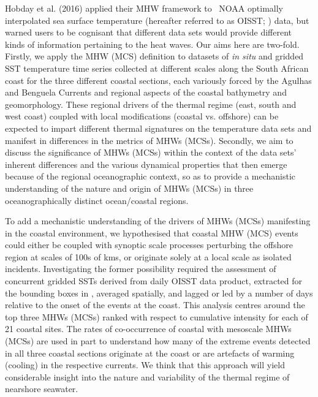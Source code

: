 \documentclass[a4paper,10pt,review]{elsarticle}
\begin{document}
Hobday et al. (2016) \cite{Hobday2016} applied their MHW framework to \degree~NOAA optimally interpolated sea surface temperature (hereafter referred to as OISST; \cite{Reynolds2007}) data, but warned users to be cognisant that different data sets would provide different kinds of information pertaining to the heat waves. Our aims here are two-fold. Firstly, we apply the MHW (MCS) definition to datasets of \emph{in situ} and gridded SST temperature time series collected at different scales along the South African coast for the three different coastal sections, each variously forced by the Agulhas and Benguela Currents and regional aspects of the coastal bathymetry and geomorphology. These regional drivers of the thermal regime (east, south and west coast) coupled with local modifications (coastal vs. offshore) can be expected to impart different thermal signatures on the temperature data sets and manifest in differences in the metrics of MHWs (MCSs). Secondly, we aim to discuss the significance of MHWs (MCSs) within the context of the data sets’ inherent differences and the various dynamical properties that then emerge because of the regional oceanographic context, so as to provide a mechanistic understanding of the nature and origin of MHWs (MCSs) in three oceanographically distinct ocean/coastal regions.

To add a mechanistic understanding of the drivers of MHWs (MCSs) manifesting in the coastal environment, we hypothesised that coastal MHW (MCS) events could either be coupled with synoptic scale processes perturbing the offshore region at scales of 100s of kms, or originate solely at a local scale as isolated incidents. Investigating the former possibility required the assessment of concurrent gridded SSTs derived from daily OISST data product, extracted for the bounding boxes in , averaged spatially, and lagged or led by a number of days relative to the onset of the events at the coast. This analysis centres around the top three MHWs (MCSs) ranked with respect to cumulative intensity for each of 21 coastal sites. The rates of co-occurrence of coastal with mesoscale MHWs (MCSs) are used in part to understand how many of the extreme events detected in all three coastal sections originate at the coast or are artefacts of warming (cooling) in the respective currents. We think that this approach will yield considerable insight into the nature and variability of the thermal regime of nearshore seawater.
\end{document}
